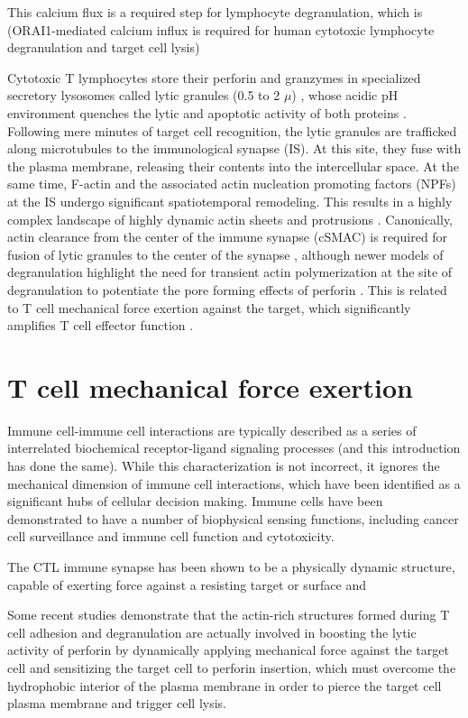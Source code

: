 This calcium flux is a required step for lymphocyte degranulation, which is (ORAI1-mediated calcium influx is required for human cytotoxic lymphocyte degranulation and target cell lysis)

Cytotoxic T lymphocytes store their perforin and granzymes in specialized secretory lysosomes called lytic granules (0.5 to 2 $\mu$) \cite{Sanchez-Ruiz2011}, whose acidic pH environment quenches the lytic and apoptotic activity of both proteins \cite{Thiery2014, Keefe2005}. Following mere minutes of target cell recognition, the lytic granules are trafficked along microtubules to the immunological synapse (IS). At this site, they fuse with the plasma membrane, releasing their contents into the intercellular space. At the same time,  F-actin and the associated actin nucleation promoting factors (NPFs) at the IS undergo significant spatiotemporal remodeling.  This results in a highly complex landscape of highly dynamic actin sheets and protrusions \cite{Ritter2015}. Canonically, actin clearance from the center of the immune synapse (cSMAC) is required for fusion of lytic granules to the center of the synapse \cite{Ritter2015}, although newer models of degranulation highlight the need for transient actin polymerization at the site of degranulation to potentiate the pore forming effects of perforin \cite{Tamzalit2018}. This is related to T cell mechanical force exertion against the target, which significantly amplifies T cell effector function \cite{Tamzalit2018}.

\section{T cell mechanical force exertion}
Immune cell-immune cell interactions are typically described as a series of interrelated biochemical receptor-ligand signaling processes (and this introduction has done the same). While this characterization is not incorrect, it ignores the mechanical dimension of immune cell interactions, which have been identified as a significant hubs of cellular decision making. Immune cells have been demonstrated to have a number of biophysical sensing functions, including cancer cell surveillance and immune cell function and cytotoxicity.

The CTL immune synapse has been shown to be a physically dynamic structure, capable of exerting force against a resisting target or surface and 

Some recent studies demonstrate that the actin-rich structures formed during T cell adhesion and degranulation are actually involved in boosting the lytic activity of perforin by dynamically applying mechanical force against the target cell \cite{Basu2016, Tamzalit2018} and sensitizing the target cell to perforin insertion, which must overcome the hydrophobic interior of the plasma membrane in order to pierce the target cell plasma membrane and trigger cell lysis.

